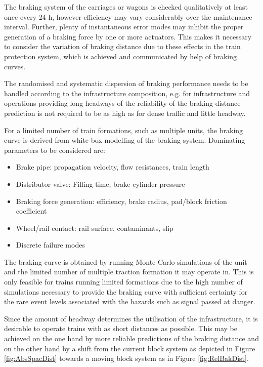 \documentclass[a4paper, 12pt]{scrartcl}
\begin{document}
The braking system of the carriages or wagons is checked qualitatively at least once every 24 h, however efficiency may vary considerably over the maintenance interval. Further, plenty of instantaneous error modes may inhibit the proper generation of a braking force by one or more actuators. This makes it necessary to consider the variation of braking distance due to these effects in the train protection system, which is achieved and communicated by help of braking curves. 

The randomised and systematic dispersion of braking performance needs to be handled according to the infrastructure composition, e.g. for infrastructure and operations providing long headways of the reliability of the braking distance prediction is not required to be as high as for dense traffic and little headway.

For a limited number of train formations, such as multiple units, the braking curve is derived from white box modelling of the braking system. Dominating parameters to be considered are:
\begin{itemize}
	\item Brake pipe: propagation velocity, flow resistances, train length
	\item Distributor valve: Filling time, brake cylinder pressure
	\item Braking force generation: efficiency, brake radius, pad/block friction coefficient
	\item Wheel/rail contact: rail surface, contaminants, slip
 	\item Discrete failure modes \cite{tsilocpas}
\end{itemize} 
The braking curve is obtained by running Monte Carlo simulations of the unit and the limited number of multiple traction formation it may operate in. 
This is only feasible for trains running limited formations due to the high number of simulations necessary to provide the braking curve with sufficient certainty for the rare event levels associated with the hazards such as signal passed at danger.

Since the amount of headway determines the utilisation of the infrastructure, it is desirable to operate trains with as short distances as possible. This may be achieved on the one hand by more reliable predictions of the braking distance and on the other hand by a shift from the current block system as depicted in Figure \ref{fig:AbsSpacDist} towards a moving block system as in Figure \ref{fig:RelBakDist}.
\end{document}
